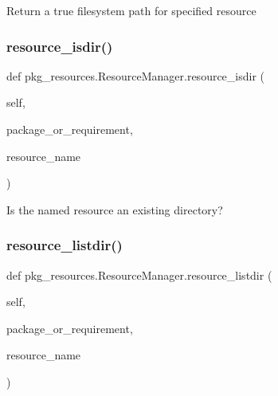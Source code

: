 \begin{DoxyVerb}Return a true filesystem path for specified resource\end{DoxyVerb}
 \mbox{\label{classpkg__resources_1_1ResourceManager_a32204e72f09b8a5f92e50d8ef1636bc6}} 
\subsubsection{\texorpdfstring{resource\+\_\+isdir()}{resource\_isdir()}}
{\footnotesize\ttfamily def pkg\+\_\+resources.\+Resource\+Manager.\+resource\+\_\+isdir (\begin{DoxyParamCaption}\item[{}]{self,  }\item[{}]{package\+\_\+or\+\_\+requirement,  }\item[{}]{resource\+\_\+name }\end{DoxyParamCaption})}

\begin{DoxyVerb}Is the named resource an existing directory?\end{DoxyVerb}
 \mbox{\label{classpkg__resources_1_1ResourceManager_aa613cb6baad8c9bdb748e6592536022d}} 
\subsubsection{\texorpdfstring{resource\+\_\+listdir()}{resource\_listdir()}}
{\footnotesize\ttfamily def pkg\+\_\+resources.\+Resource\+Manager.\+resource\+\_\+listdir (\begin{DoxyParamCaption}\item[{}]{self,  }\item[{}]{package\+\_\+or\+\_\+requirement,  }\item[{}]{resource\+\_\+name }\end{DoxyParamCaption})}

